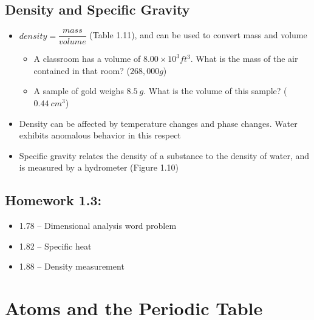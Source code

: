 \documentclass[12pt, openany, letterpaper]{memoir}
\begin{document}
\section{Density and Specific Gravity}
\begin{itemize}
	\item $density=\dfrac{mass}{volume}$ (Table 1.11), and can be used to convert mass and volume
	      \begin{itemize}
		      \item A classroom has a volume of $8.00\times 10^3ft^3$. What is the mass of the air contained in that room? ($268,000g$)
		      \item A sample of gold weighs $8.5~g$. What is the volume of this sample? ($0.44~cm^3$)
	      \end{itemize}
	\item Density can be affected by temperature changes and phase changes. Water exhibits anomalous behavior in this respect
	\item Specific gravity relates the density of a substance to the density of water, and is measured by a hydrometer (Figure 1.10)
\end{itemize}

\section*{Homework 1.3:}
\begin{itemize}
	\item 1.78 -- Dimensional analysis word problem
	\item 1.82 -- Specific heat
	\item 1.88 -- Density measurement
\end{itemize}

\chapter{Atoms and the Periodic Table}%
\end{document}
